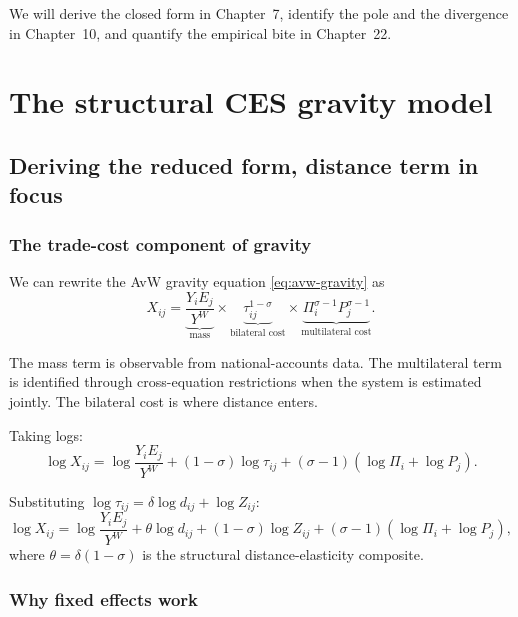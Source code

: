 \documentclass[11pt,letterpaper,oneside]{book}
\theoremstyle{definition}
\theoremstyle{remark}
\begin{document}
We will derive the closed form in Chapter~7, identify the pole and the divergence in Chapter~10, and quantify the empirical bite in Chapter~22.

\part{The structural CES gravity model}

\chapter{Deriving the reduced form, distance term in focus}

\section{The trade-cost component of gravity}

We can rewrite the AvW gravity equation \eqref{eq:avw-gravity} as
\begin{equation}
X_{ij} = \underbrace{\frac{Y_i E_j}{Y^W}}_{\text{mass}} \times \underbrace{\tau_{ij}^{1-\sigma}}_{\text{bilateral cost}} \times \underbrace{\Pi_i^{\sigma-1} P_j^{\sigma-1}}_{\text{multilateral cost}}.
\label{eq:gravity-decomposed}
\end{equation}

The mass term is observable from national-accounts data. The multilateral term is identified through cross-equation restrictions when the system is estimated jointly. The bilateral cost is where distance enters.

Taking logs:
\begin{equation}
\log X_{ij} = \log \frac{Y_i E_j}{Y^W} + (1-\sigma) \log \tau_{ij} + (\sigma-1)(\log \Pi_i + \log P_j).
\label{eq:gravity-logs}
\end{equation}

Substituting $\log \tau_{ij} = \delta \log d_{ij} + \log Z_{ij}$:
\begin{equation}
\log X_{ij} = \log \frac{Y_i E_j}{Y^W} + \theta \log d_{ij} + (1-\sigma)\log Z_{ij} + (\sigma-1)(\log \Pi_i + \log P_j),
\label{eq:gravity-logs-distance}
\end{equation}
where $\theta = \delta(1-\sigma)$ is the structural distance-elasticity composite.

\section{Why fixed effects work}
\end{document}
